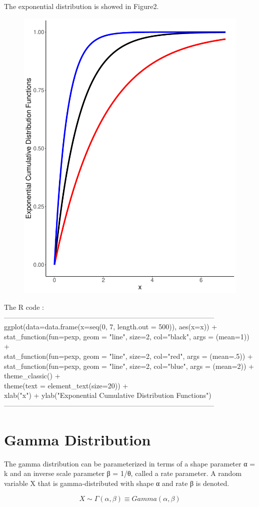 \documentclass{book} %
\begin{document}
The exponential distribution is showed in Figure2.
\begin{figure}[H]
	\centering
	\includegraphics[width=0.7\linewidth, height=0.5\textheight]{dexp}
	\caption{}
	\label{fig:dexp}
\end{figure}
\noindent The R code :\\
------------------------------------------------------------------------------------------\\
ggplot(data=data.frame(x=seq(0, 7, length.out = 500)), aes(x=x)) +\\
stat\_function(fun=pexp, geom = "line", size=2, col="black", args = (mean=1)) +\\
stat\_function(fun=pexp, geom = "line", size=2, col="red", args = (mean=.5)) +\\
stat\_function(fun=pexp, geom = "line", size=2, col="blue", args = (mean=2)) +\\
theme\_classic() +\\
theme(text = element\_text(size=20)) +\\
xlab("x") + ylab("Exponential Cumulative Distribution Functions")\\
------------------------------------------------------------------------------------------\\
\section{Gamma Distribution}
The gamma distribution can be parameterized in terms of a shape parameter α = k and an inverse scale parameter β = 1/θ, called a rate parameter. A random variable X that is gamma-distributed with shape α and rate β is denoted.\\
\begin{center}
	\begin{equation}
	X\sim \Gamma (\alpha,\beta)\equiv Gamma(\alpha,\beta)
	\end{equation} 
\end{center}
\end{document}
